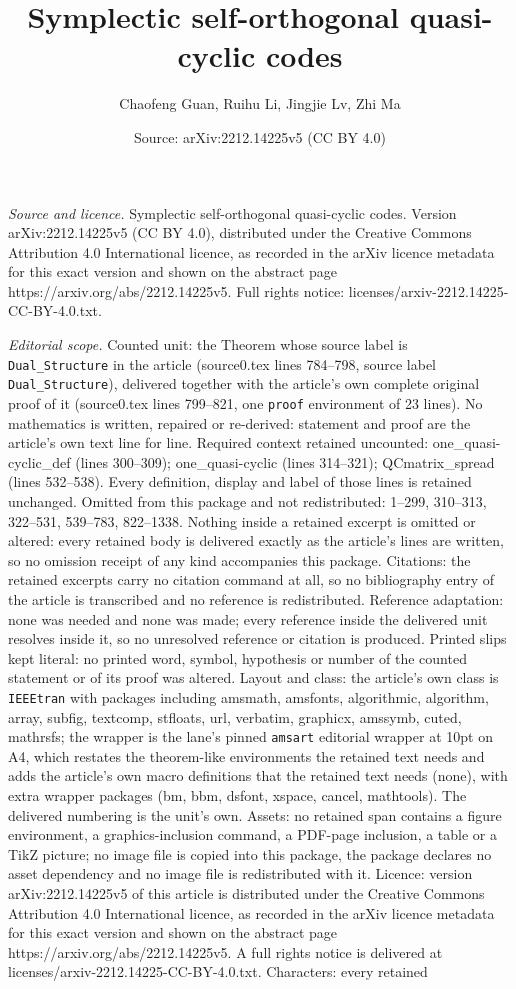 \documentclass[10pt,a4paper]{amsart}
\title[Symplectic self-orthogonal quasi-cyclic codes]{Symplectic self-orthogonal quasi-cyclic codes}
\author{Chaofeng Guan, Ruihu Li, Jingjie Lv, Zhi Ma}
\date{Source: arXiv:2212.14225v5 (CC BY 4.0)}
\begin{document}
\maketitle

\noindent\emph{Source and licence.} Symplectic self-orthogonal quasi-cyclic codes. Version arXiv:2212.14225v5 (CC BY 4.0), distributed under the Creative Commons Attribution 4.0 International licence, as recorded in the arXiv licence metadata for this exact version and shown on the abstract page https://arxiv.org/abs/2212.14225v5. Full rights notice: licenses/arxiv-2212.14225-CC-BY-4.0.txt.\par\smallskip

\noindent\textit{Editorial scope.} Counted unit: the Theorem whose source label is \texttt{Dual\_Structure} in the article (source0.tex lines 784--798, source label \texttt{Dual\_Structure}), delivered together with the article's own complete original proof of it (source0.tex lines 799--821, one \texttt{proof} environment of 23 lines). No mathematics is written, repaired or re-derived: statement and proof are the article's own text line for line. Required context retained uncounted: one\_quasi-cyclic\_def (lines 300--309); one\_quasi-cyclic (lines 314--321); QCmatrix\_spread (lines 532--538). Every definition, display and label of those lines is retained unchanged. Omitted from this package and not redistributed: 1--299, 310--313, 322--531, 539--783, 822--1338. Nothing inside a retained excerpt is omitted or altered: every retained body is delivered exactly as the article's lines are written, so no omission receipt of any kind accompanies this package. Citations: the retained excerpts carry no citation command at all, so no bibliography entry of the article is transcribed and no reference is redistributed. Reference adaptation: none was needed and none was made; every reference inside the delivered unit resolves inside it, so no unresolved reference or citation is produced. Printed slips kept literal: no printed word, symbol, hypothesis or number of the counted statement or of its proof was altered. Layout and class: the article's own class is \texttt{IEEEtran} with packages including amsmath, amsfonts, algorithmic, algorithm, array, subfig, textcomp, stfloats, url, verbatim, graphicx, amssymb, cuted, mathrsfs; the wrapper is the lane's pinned \texttt{amsart} editorial wrapper at 10pt on A4, which restates the theorem-like environments the retained text needs and adds the article's own macro definitions that the retained text needs (none), with extra wrapper packages (bm, bbm, dsfont, xspace, cancel, mathtools). The delivered numbering is the unit's own. Assets: no retained span contains a figure environment, a graphics-inclusion command, a PDF-page inclusion, a table or a TikZ picture; no image file is copied into this package, the package declares no asset dependency and no image file is redistributed with it. Licence: version arXiv:2212.14225v5 of this article is distributed under the Creative Commons Attribution 4.0 International licence, as recorded in the arXiv licence metadata for this exact version and shown on the abstract page https://arxiv.org/abs/2212.14225v5. A full rights notice is delivered at licenses/arxiv-2212.14225-CC-BY-4.0.txt. Characters: every retained 
\end{document}
